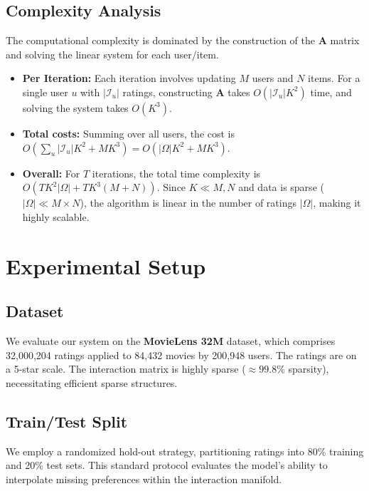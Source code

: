 \documentclass{article}
\theoremstyle{plain}
\theoremstyle{definition}
\theoremstyle{remark}
\begin{document}
\subsection{Complexity Analysis}
The computational complexity is dominated by the construction of the $\mathbf{A}$ matrix and solving the linear system for each user/item.
\begin{itemize}
    \item \textbf{Per Iteration:} Each iteration involves updating $M$ users and $N$ items. For a single user $u$ with $|\mathcal{I}_u|$ ratings, constructing $\mathbf{A}$ takes $O(|\mathcal{I}_u| K^2)$ time, and solving the system takes $O(K^3)$.
    \item \textbf{Total costs:} Summing over all users, the cost is $O(\sum_u |\mathcal{I}_u| K^2 + M K^3) = O(|\Omega| K^2 + M K^3)$.
    \item \textbf{Overall:} For $T$ iterations, the total time complexity is $O(T K^2 |\Omega| + T K^3 (M + N))$. Since $K \ll M, N$ and data is sparse ($|\Omega| \ll M \times N$), the algorithm is linear in the number of ratings $|\Omega|$, making it highly scalable.
\end{itemize}

\section{Experimental Setup} %

\subsection{Dataset}
We evaluate our system on the \textbf{MovieLens 32M} dataset, which comprises 32,000,204 ratings applied to 84,432 movies by 200,948 users. The ratings are on a 5-star scale. The interaction matrix is highly sparse ($\approx 99.8\%$ sparsity), necessitating efficient sparse structures.

\subsection{Train/Test Split}
We employ a randomized hold-out strategy, partitioning ratings into 80\% training and 20\% test sets. This standard protocol evaluates the model's ability to interpolate missing preferences within the interaction manifold.
\end{document}
